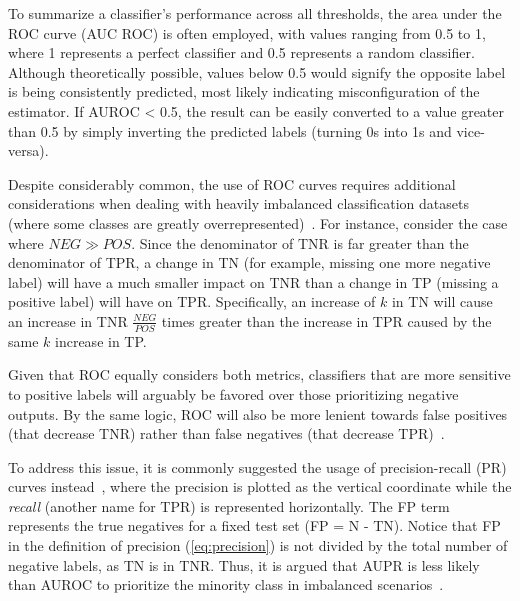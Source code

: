 

To summarize a classifier's performance across all thresholds, the area under the ROC curve (AUC ROC) is often employed, with values ranging from 0.5 to 1, where 1 represents a perfect classifier and 0.5 represents a random classifier. Although theoretically possible, values below 0.5 would signify the opposite label is being consistently predicted, most likely indicating misconfiguration of the estimator. If AUROC < 0.5, the result can be easily converted to a value greater than 0.5 by simply inverting the predicted labels (turning 0s into 1s and vice-versa).

Despite considerably common, the use of ROC curves requires additional considerations when dealing with heavily imbalanced classification datasets (where some classes are greatly overrepresented)~\cite{he2009learning,saito2015precisionrecall,fernandez2018learning}.
For instance,%
consider the case where $NEG \gg POS$. Since the denominator of TNR is far greater than the denominator of TPR, a change in TN (for example, missing one more negative label) will have a much smaller impact on TNR than a change in TP (missing a positive label) will have on TPR.
Specifically, an increase of $k$ in TN will cause an increase in TNR $\frac{NEG}{POS}$ times greater than the increase in TPR caused by the same $k$ increase in TP.


Given that ROC equally considers both metrics, classifiers that are more sensitive to positive labels will arguably be favored over those prioritizing negative outputs. By the same logic, ROC will also be more lenient towards false positives (that decrease TNR) rather than false negatives (that decrease TPR)~\cite{ozenne2015precision}.

To address this issue, it is commonly suggested the usage of precision-recall (PR) curves instead~\cite{ozenne2015precision,he2009learning,pahikkala2015more,hao2019opensource,ezzat2019computational,yu2020fpscdtia}, where the precision is plotted as the vertical coordinate while the \emph{recall} (another name for TPR) is represented horizontally.
%
The FP term represents the true negatives for a fixed test set (FP = N - TN). Notice that FP in the definition of precision (\autoref{eq:precision}) is not divided by the total number of negative labels, as TN is in TNR. Thus, it is argued that AUPR is less likely than AUROC to prioritize the minority class in imbalanced scenarios~\cite{ozenne2015precision,he2009learning}.


